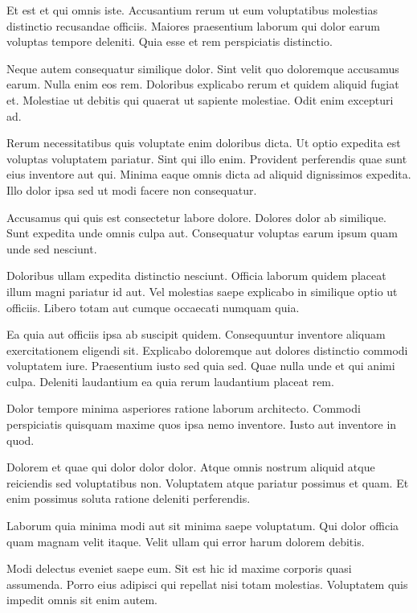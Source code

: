 \documentclass[a4paper]{article}
\begin{document}
\begin{multicols}{2}

Et est et qui omnis iste. Accusantium rerum ut eum voluptatibus molestias
    distinctio recusandae officiis. Maiores praesentium laborum qui dolor earum
    voluptas tempore deleniti. Quia esse et rem perspiciatis distinctio.

Neque autem consequatur similique dolor. Sint velit quo doloremque accusamus
    earum. Nulla enim eos rem. Doloribus explicabo rerum et quidem aliquid
    fugiat et. Molestiae ut debitis qui quaerat ut sapiente molestiae. Odit enim
    excepturi ad.

Rerum necessitatibus quis voluptate enim doloribus dicta. Ut optio expedita est
    voluptas voluptatem pariatur. Sint qui illo enim. Provident perferendis quae
    sunt eius inventore aut qui. Minima eaque omnis dicta ad aliquid dignissimos
    expedita. Illo dolor ipsa sed ut modi facere non consequatur.

Accusamus qui quis est consectetur labore dolore. Dolores dolor ab similique.
    Sunt expedita unde omnis culpa aut. Consequatur voluptas earum ipsum quam
    unde sed nesciunt.

Doloribus ullam expedita distinctio nesciunt. Officia laborum quidem placeat
    illum magni pariatur id aut. Vel molestias saepe explicabo in similique
    optio ut officiis. Libero totam aut cumque occaecati numquam quia.

Ea quia aut officiis ipsa ab suscipit quidem. Consequuntur inventore aliquam
    exercitationem eligendi sit. Explicabo doloremque aut dolores distinctio
    commodi voluptatem iure. Praesentium iusto sed quia sed. Quae nulla unde et
    qui animi culpa. Deleniti laudantium ea quia rerum laudantium placeat rem.

Dolor tempore minima asperiores ratione laborum architecto. Commodi perspiciatis
    quisquam maxime quos ipsa nemo inventore. Iusto aut inventore in quod.

Dolorem et quae qui dolor dolor dolor. Atque omnis nostrum aliquid atque
    reiciendis sed voluptatibus non. Voluptatem atque pariatur possimus et quam.
    Et enim possimus soluta ratione deleniti perferendis.

Laborum quia minima modi aut sit minima saepe voluptatum. Qui dolor officia quam
    magnam velit itaque. Velit ullam qui error harum dolorem debitis.

Modi delectus eveniet saepe eum. Sit est hic id maxime corporis quasi assumenda.
    Porro eius adipisci qui repellat nisi totam molestias. Voluptatem quis
    impedit omnis sit enim autem.


\end{multicols}
\end{document}
